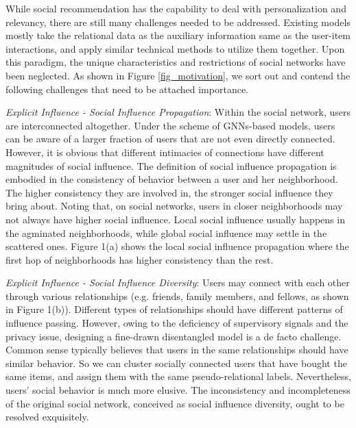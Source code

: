 \documentclass[letterpaper]{article} %
\begin{document}
While social recommendation has the capability to deal with personalization and relevancy, there are still many challenges needed to be addressed. Existing models mostly take the relational data as the auxiliary information same as the user-item interactions, and apply similar technical methods to utilize them together. Upon this paradigm, the unique characteristics and restrictions of social networks have been neglected. As shown in Figure \ref{fig_motivation}, we sort out and contend the following challenges that need to be attached importance.

\textit{Explicit Influence \uppercase\expandafter{} - Social Influence Propagation}: Within the social network, users are interconnected altogether. Under the scheme of GNNs-based models, users can be aware of a larger fraction of users that are not even directly connected. However, it is obvious that different intimacies of connections have different magnitudes of social influence. The definition of social influence propagation is embodied in the consistency of behavior between a user and her neighborhood. The higher consistency they are involved in, the stronger social influence they bring about. Noting that, on social networks, users in closer neighborhoods may not always have higher social influence. Local social influence usually happens in the agminated neighborhoods,  while global social influence may settle in the scattered ones. Figure 1(a) shows the local social influence propagation where the first hop of neighborhoods has higher consistency than the rest.

\textit{Explicit Influence \uppercase\expandafter{} - Social Influence Diversity}: Users may connect with each other through various relationships (e.g. friends, family members, and fellows, as shown in Figure 1(b)). Different types of relationships should have different patterns of influence passing. However, owing to the deficiency of supervisory signals and the privacy issue, designing a fine-drawn disentangled model is a de facto challenge. Common sense typically believes that users in the same relationships should have similar behavior. So we can cluster socially connected users that have bought the same items, and assign them with the same pseudo-relational labels. Nevertheless, users' social behavior is much more elusive. The inconsistency and incompleteness of the original social network, conceived as social influence diversity, ought to be resolved exquisitely.
\end{document}
